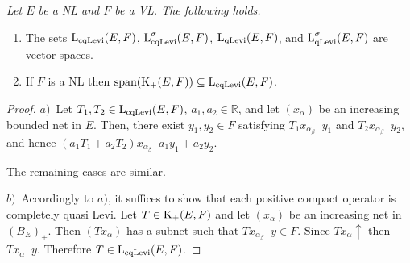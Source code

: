 \documentclass[10pt,a4paper]{amsart}
\DeclareMathOperator{\convn}{\xrightarrow[]{\|\cdot\|}}
\DeclareMathOperator{\convo}{\xrightarrow[]{o}}
\begin{document}
\begin{lemma}\label{prop2}%
{\em
Let $E$ be a NL and $F$ be a VL. The following holds.
\begin{enumerate}[$a)$]
\item 
The sets $\text{\rm L}_{\text{\rm cqLevi}}(E,F)$,
$\text{\rm L}^\sigma_{\text{\rm cqLevi}}(E,F)$,
$\text{\rm L}_{\text{\rm qLevi}}(E,F)$,
and $\text{\rm L}^\sigma_{\text{\rm qLevi}}(E,F)$ are vector spaces.
\item 
If $F$ is a NL then
$\text{\rm span}(\text{\rm K}_+(E,F))\subseteq\text{\rm L}_{\text{\rm cqLevi}}(E,F)$.
\end{enumerate}}
\end{lemma}

\begin{proof}
$a)$\
Let $T_1,T_2\in\text{\rm L}_{\text{\rm cqLevi}}(E,F)$, $a_1,a_2\in\mathbb{R}$, and let 
$(x_\alpha)$ be an increasing bounded net in $E$. Then, there exist 
$y_1,y_2\in F$ satisfying $T_1x_{\alpha_\beta}\convo y_1$ and 
$T_2x_{\alpha_\beta}\convo y_2$, and hence 
$(a_1T_1+a_2T_2)x_{\alpha_\beta}\convo a_1y_1+a_2y_2$.

The remaining cases are similar.
\medskip

$b)$\
Accordingly to $a)$, it suffices to show that each positive compact operator 
is completely quasi Levi.
Let $T\in\text{\rm K}_+(E,F)$ and let $(x_\alpha)$ be an 
increasing net in $(B_E)_+$. Then $(Tx_\alpha)$ has a subnet such that
$Tx_{\alpha_\beta}\convn y\in F$. Since $Tx_\alpha\uparrow$ then $Tx_\alpha\convo y$. 
Therefore $T\in\text{\rm L}_{\text{\rm cqLevi}}(E,F)$.
\end{proof}
\end{document}
